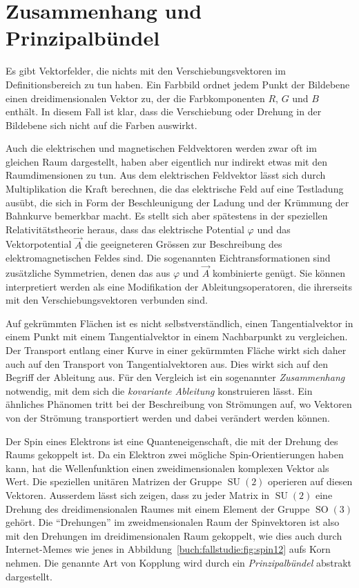 %
%
%

%
%
\section{Zusammenhang und Prinzipalbündel
\label{buch:fallstudie:prinzipalbuendel}}
Es gibt Vektorfelder, die nichts mit den Verschiebungsvektoren im
Definitionsbereich zu tun haben.
Ein Farbbild ordnet jedem Punkt der Bildebene einen dreidimensionalen
Vektor zu, der die Farbkomponenten $R$, $G$ und $B$ enthält.
In diesem Fall ist klar, dass die Verschiebung oder Drehung in der
Bildebene sich nicht auf die Farben auswirkt.

Auch die elektrischen und magnetischen Feldvektoren werden zwar
oft im gleichen Raum dargestellt, haben aber eigentlich nur indirekt
etwas mit den Raumdimensionen zu tun.
Aus dem elektrischen Feldvektor lässt sich durch Multiplikation die
Kraft berechnen, die das elektrische Feld auf eine Testladung ausübt,
die sich in Form der Beschleunigung der Ladung und der Krümmung der
Bahnkurve bemerkbar macht.
Es stellt sich aber spätestens in der speziellen Relativitätstheorie
heraus, dass das elektrische Potential $\varphi$ und das Vektorpotential
$\vec{A}$ die geeigneteren Grössen zur Beschreibung des elektromagnetischen
Feldes sind.
Die sogenannten Eichtransformationen sind zusätzliche Symmetrien, denen
das aus $\varphi$ und $\vec{A}$ kombinierte genügt.
Sie können interpretiert werden als eine Modifikation der
Ableitungsoperatoren, die ihrerseits mit den Verschiebungsvektoren
verbunden sind.

Auf gekrümmten Flächen ist es nicht selbstverständlich, einen
Tangentialvektor in einem Punkt mit einem Tangentialvektor in einem
Nachbarpunkt zu vergleichen.
Der Transport entlang einer Kurve in einer gekürmmten Fläche wirkt
sich daher auch auf den Transport von Tangentialvektoren aus.
Dies wirkt sich auf den Begriff der Ableitung aus.
Für den Vergleich ist ein sogenannter {\em Zusammenhang} notwendig, mit
dem sich die {\em kovariante Ableitung} konstruieren lässt.
Ein ähnliches Phänomen tritt bei der Beschreibung von Strömungen
auf, wo Vektoren von der Strömung transportiert werden und dabei
verändert werden können.

%

Der Spin eines Elektrons ist eine Quanteneigenschaft, die mit der
Drehung des Raums gekoppelt ist.
Da ein Elektron zwei mögliche Spin-Orientierungen haben kann, hat
die Wellenfunktion einen zweidimensionalen komplexen Vektor als Wert.
Die speziellen unitären Matrizen der Gruppe $\operatorname{SU}(2)$ 
operieren auf diesen Vektoren.
Ausserdem lässt sich zeigen, dass zu jeder Matrix in $\operatorname{SU}(2)$
eine Drehung des dreidimensionalen Raumes mit einem Element der
Gruppe $\operatorname{SO}(3)$ gehört.
Die ``Drehungen'' im zweidmensionalen Raum der Spinvektoren ist also
mit den Drehungen im dreidimensionalen Raum gekoppelt, wie dies auch
durch Internet-Memes wie jenes in Abbildung~\ref{buch:fallstudie:fig:spin12}
aufs Korn nehmen.
Die genannte Art von Kopplung wird durch ein {\em Prinzipalbündel}
abstrakt dargestellt.

